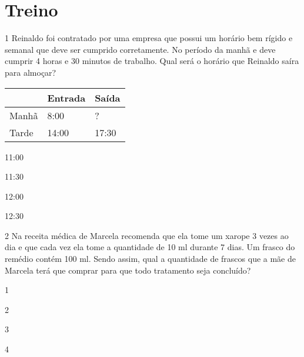 

\section{Treino}

\num{1} Reinaldo foi contratado por uma empresa que possui um horário bem
rígido e semanal que deve ser cumprido corretamente. No período da manhã
e deve cumprir 4 horas e 30 minutos de trabalho. Qual será o horário que
Reinaldo saíra para almoçar?

\begin{longtable}[]{@{}lll@{}}
\toprule
& Entrada & Saída\tabularnewline
\midrule
\endhead
Manhã & 8:00 & ?\tabularnewline
Tarde & 14:00 & 17:30\tabularnewline
\bottomrule
\end{longtable}

\begin{escolha}
\item
  11:00
\item
  11:30
\item
  12:00
\item
  12:30
\end{escolha}


\num{2} Na receita médica de Marcela recomenda que ela tome um xarope 3
vezes ao dia e que cada vez ela tome a quantidade de 10 ml durante 7
dias. Um frasco do remédio contém 100 ml. Sendo assim, qual a quantidade
de frascos que a mãe de Marcela terá que comprar para que todo
tratamento seja concluído?

\begin{escolha}
\item
  1
\item
  2
\item
  3
\item
  4
\end{escolha}



